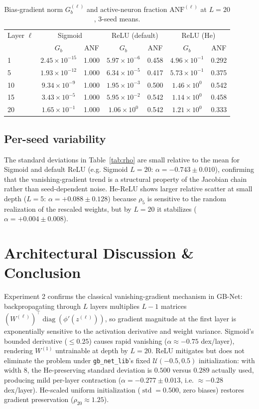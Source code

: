 \documentclass[11pt,a4paper]{article}
\begin{document}
\begin{table}[H]
\centering
\caption{Bias-gradient norm $G_b^{(\ell)}$ and active-neuron fraction $\text{ANF}^{(\ell)}$ at $L=20$, 3-seed means.}
\label{tab:bias}
{\small
\setlength{\tabcolsep}{5pt}
\begin{tabular}{lcccccc}
\toprule
Layer $\ell$ & \multicolumn{2}{c}{Sigmoid} & \multicolumn{2}{c}{ReLU (default)} & \multicolumn{2}{c}{ReLU (He)} \\
 & $G_b$ & ANF & $G_b$ & ANF & $G_b$ & ANF \\
\midrule
1  & $2.45\times10^{-15}$ & 1.000 & $5.97\times10^{-6}$ & 0.458 & $4.96\times10^{-1}$ & 0.292 \\
5  & $1.93\times10^{-12}$ & 1.000 & $6.34\times10^{-5}$ & 0.417 & $5.73\times10^{-1}$ & 0.375 \\
10 & $9.34\times10^{-9}$ & 1.000 & $1.95\times10^{-3}$ & 0.500 & $1.46\times10^{0}$ & 0.542 \\
15 & $3.43\times10^{-5}$ & 1.000 & $5.95\times10^{-2}$ & 0.542 & $1.14\times10^{0}$ & 0.458 \\
20 & $1.65\times10^{-1}$ & 1.000 & $1.06\times10^{0}$ & 0.542 & $1.21\times10^{0}$ & 0.333 \\
\bottomrule
\end{tabular}}
\end{table}

\subsection{Per-seed variability}
The standard deviations in Table~\ref{tab:rho} are small relative to the mean for Sigmoid and default ReLU (e.g. Sigmoid $L=20$: $\alpha = -0.743 \pm 0.010$), confirming that the vanishing-gradient trend is a structural property of the Jacobian chain rather than seed-dependent noise. He-ReLU shows larger relative scatter at small depth ($L=5$: $\alpha = +0.088 \pm 0.128$) because $\rho_5$ is sensitive to the random realization of the rescaled weights, but by $L=20$ it stabilizes ($\alpha = +0.004 \pm 0.008$).

\section{Architectural Discussion \& Conclusion}

Experiment 2 confirms the classical vanishing-gradient mechanism in GB-Net: backpropagating through $L$ layers multiplies $L-1$ matrices $(W^{(\ell)})^\top \operatorname{diag}(\phi'(z^{(\ell)}))$, so gradient magnitude at the first layer is exponentially sensitive to the activation derivative and weight variance. Sigmoid's bounded derivative ($\le 0.25$) causes rapid vanishing ($\alpha \approx -0.75$ dex/layer), rendering $W^{(1)}$ untrainable at depth by $L=20$. ReLU mitigates but does not eliminate the problem under \texttt{gb\_net\_lib}'s fixed $\mathcal{U}(-0.5, 0.5)$ initialization: with width 8, the He-preserving standard deviation is $0.500$ versus $0.289$ actually used, producing mild per-layer contraction ($\alpha = -0.277 \pm 0.013$, i.e. $\approx -0.28$ dex/layer). He-scaled uniform initialization ($\operatorname{std}=0.500$, zero biases) restores gradient preservation ($\rho_{20} \approx 1.25$).
\end{document}
